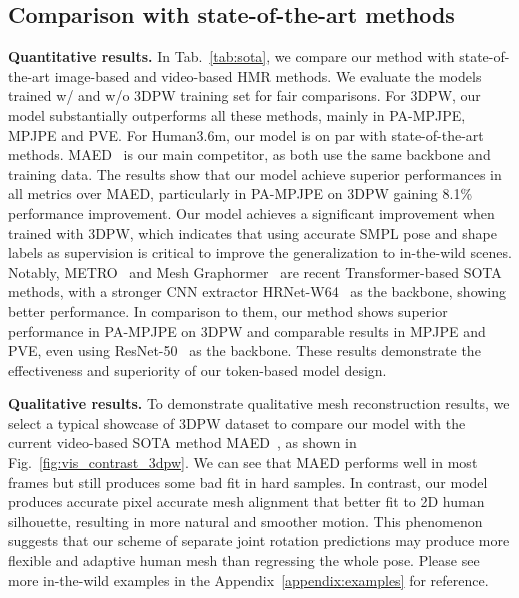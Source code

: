 \subsection{Comparison with state-of-the-art methods}


                                     

{\bf Quantitative results.} In Tab.~\ref{tab:sota}, we compare our method with state-of-the-art image-based and video-based HMR methods. We evaluate the models trained w/ and w/o 3DPW training set for fair comparisons.  For 3DPW, our model substantially outperforms all these methods, mainly in PA-MPJPE, MPJPE and PVE. For Human3.6m, our model is on par with state-of-the-art methods. 
MAED~\citep{maed:wan2021encoder} is our main competitor, as both use the same backbone and training data. The results show that our model achieve superior performances in all metrics over MAED, particularly in PA-MPJPE on 3DPW gaining 8.1\% performance improvement. 
Our model achieves a significant improvement when trained with 3DPW, which indicates that using accurate SMPL pose and shape labels as supervision is critical to improve the generalization to in-the-wild scenes. 
Notably, METRO~\citep{metro:lin2021end} and Mesh Graphormer~\citep{meshgrahormer:lin2021mesh} are recent Transformer-based SOTA methods, with a stronger CNN extractor HRNet-W64~\citep{hrnet:sun2019deep} as the backbone, showing better performance. In comparison to them, our method shows superior performance in PA-MPJPE on 3DPW and comparable results in MPJPE and PVE, even using ResNet-50~\citep{resnet:he2016deep} as the backbone. These results demonstrate the effectiveness and superiority of our token-based model design.

{\bf Qualitative results.} To demonstrate qualitative mesh reconstruction results, we select a typical showcase of 3DPW dataset to compare our model with the current video-based SOTA method MAED~\citep{maed:wan2021encoder}, as shown in Fig.~\ref{fig:vis_contrast_3dpw}. We can see that MAED performs well in most frames but still produces some bad fit in hard samples. 
In contrast, our model produces accurate pixel accurate mesh alignment that better fit to 2D human silhouette, resulting in more natural and smoother motion. 
This phenomenon suggests that our scheme of separate joint rotation predictions may produce more flexible and adaptive human mesh than regressing the whole pose.
Please see more in-the-wild examples in the Appendix~\ref{appendix:examples} for reference.







